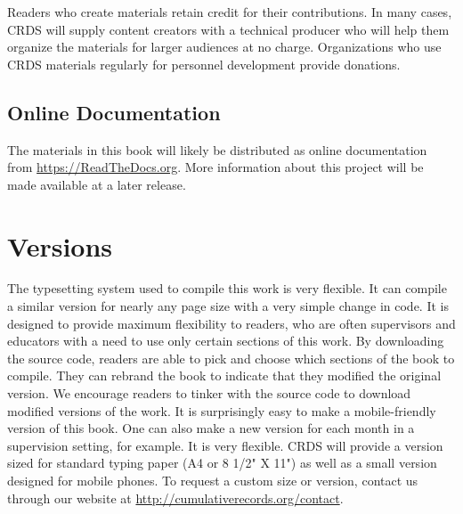 \documentclass[float=false, crop=false]{standalone}
\begin{document}
Readers who create materials retain credit for their contributions. In many cases, CRDS will supply content creators with a technical producer who will help them organize the materials for larger audiences at no charge. Organizations who use CRDS materials regularly for personnel development provide donations.

\subsection{Online Documentation}
The materials in this book will likely be distributed as online documentation from \url{https://ReadTheDocs.org}. More information about this project will be made available at a later release. 

\section{Versions}
The typesetting system used to compile this work is very flexible. It can compile a similar version for nearly any page size with a very simple change in code. It is designed to provide maximum flexibility to readers, who are often supervisors and educators with a need to use only certain sections of this work. By downloading the source code, readers are able to pick and choose which sections of the book to compile. They can rebrand the book to indicate that they modified the original version. We encourage readers to tinker with the source code to download modified versions of the work. It is surprisingly easy to make a mobile-friendly version of this book. One can also make a new version for each month in a supervision setting, for example. It is very flexible. CRDS will provide a version sized for standard typing paper (A4 or 8 1/2" X 11") as well as a small version designed for mobile phones. To request a custom size or version, contact us through our website at \url{http://cumulativerecords.org/contact}.
\end{document}
